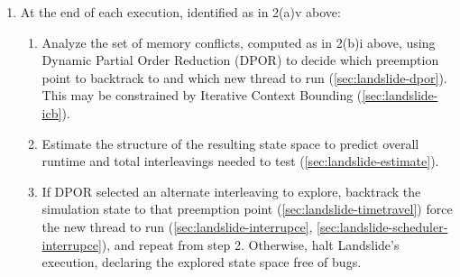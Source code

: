 {\begin{enumerate}
\begin{enumerate}
\begin{enumerate}
					\item Check the set of memory accesses since the previous preemption point,
						recorded as in 2(a)ii above,
						for conflicts with other threads
						(\cref{sec:landslide-shm}),
						and further for data races (\cref{sec:landslide-datarace}).
					\item Select which thread should run next (\cref{sec:landslide-arbiter}),
						Heuristically detecting yield-blocked threads
						may inform this decision (\cref{sec:landslide-blocking-yield}).
					\item Checkpoint the execution state in case future executions
						should wish to rewind and try a different thread from the one first chosen here
						(\cref{sec:landslide-save}, \cref{sec:landslide-timetravel}).
					\item Force the chosen thread to run by injecting timer interrupts
						(\cref{sec:landslide-interrupce},
						\cref{sec:landslide-scheduler-interrupce}).
				\end{enumerate}
				Note that Landslide maintains the invariant that each transition between two preemption points
				consist of instructions executed by exactly one thread;
				i.e., every thread switch must be punctuated by a preemption point.
		\end{enumerate}
	\item At the end of each execution, identified as in 2(a)v above:
		\begin{enumerate}
			\item Analyze the set of memory conflicts,
				computed as in 2(b)i above,
				using Dynamic Partial Order Reduction (DPOR)
				to decide which preemption point to backtrack to and
				which new thread to run
				(\cref{sec:landslide-dpor}).
				This may be constrained by Iterative Context Bounding (\cref{sec:landslide-icb}).
			\item Estimate the structure of the resulting state space
				to predict overall runtime and total interleavings needed to test
				(\cref{sec:landslide-estimate}).
			\item If DPOR selected an alternate interleaving to explore,
				backtrack the simulation state to that preemption point
				(\cref{sec:landslide-timetravel})
				force the new thread to run
				(\cref{sec:landslide-interrupce}, \cref{sec:landslide-scheduler-interrupce}),
				and repeat from step 2.
				Otherwise, halt Landslide's execution,
				declaring the explored state space free of bugs.
		\end{enumerate}
\end{enumerate}
}

